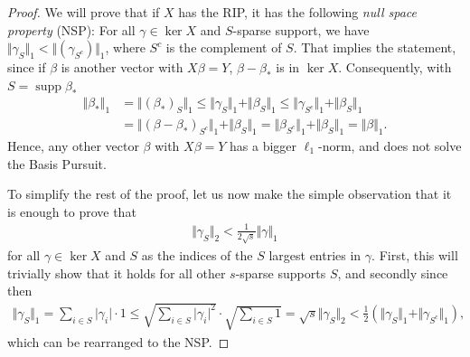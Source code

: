 \documentclass{article}
\DeclareMathOperator{\supp}{\mathrm{supp}}
\newcommand{\abs}[1]{\vert #1 \vert}
\newcommand{\norm}[1]{\Vert #1 \Vert}
\begin{document}
\begin{proof}
   We will prove that if $X$ has the RIP, it has the following \emph{null space property} (NSP): For all $\gamma \in \ker X$ and $S$-sparse support, we have $\norm{\gamma_S}_1<\norm{(\gamma_{S^c})}_1$, where $S^c$ is the complement of $S$. That implies the statement, since if $\beta$ is another vector with $X\beta = Y$, $\beta-\beta_*$ is in $\ker X$. Consequently, with $S=\supp \beta_*$
   \begin{align*}
       \norm{\beta_*}_1 &= \norm{(\beta_*)_S}_1 \leq \norm{\gamma_S}_1 + \norm{\beta_S}_1 \leq \norm{\gamma_{S^c}}_1 + \norm{\beta_S}_1 \\
       &= \norm{(\beta-\beta_*)_{S^c}}_1 + \norm{\beta_S}_1 = \norm{\beta_{S^c}}_1 + \norm{\beta_S}_1  = \norm{\beta}_1.
   \end{align*}
   Hence, any other vector $\beta$ with $X\beta=Y$ has a bigger $\ell_1$-norm, and does not solve the Basis Pursuit.

   To simplify the rest of the proof, let us now make the simple observation that it is enough to prove that 
   \begin{align*}
       \norm{\gamma_S}_2 < \frac{1}{2\sqrt{s}} \norm{\gamma}_1
   \end{align*}
   for all $\gamma \in \ker X$ and $S$ as the indices of the $S$ largest entries in $\gamma$. First, this will trivially show that it holds for all other $s$-sparse supports $S$, and secondly since then
   \begin{align*}
       \norm{\gamma_S}_1 = \sum_{i \in S} \abs{\gamma_i}\cdot 1 \leq \sqrt{\sum_{i \in S} \abs{\gamma_i}^2}\cdot \sqrt{\sum_{i \in S}1  } = \sqrt{s} \norm{\gamma_S}_2 < \frac{1}{2} ( \norm{\gamma_S}_1 + \norm{\gamma_{S^c}}_1),
   \end{align*}
   which can be rearranged to the NSP.


\end{proof}
\end{document}
